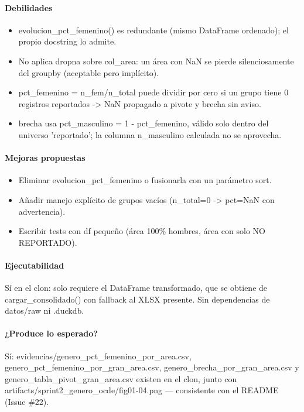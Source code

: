 \paragraph{Debilidades}
\begin{itemize}
  \item evolucion\_pct\_femenino() es redundante (mismo DataFrame ordenado); el propio docstring lo admite.
  \item No aplica dropna sobre col\_area: un área con NaN se pierde silenciosamente del groupby (aceptable pero implícito).
  \item pct\_femenino = n\_fem/n\_total puede dividir por cero si un grupo tiene 0 registros reportados -> NaN propagado a pivote y brecha sin aviso.
  \item brecha usa pct\_masculino = 1 - pct\_femenino, válido solo dentro del universo 'reportado'; la columna n\_masculino calculada no se aprovecha.
\end{itemize}

\paragraph{Mejoras propuestas}
\begin{itemize}
  \item Eliminar evolucion\_pct\_femenino o fusionarla con un parámetro sort.
  \item Añadir manejo explícito de grupos vacíos (n\_total=0 -> pct=NaN con advertencia).
  \item Escribir tests con df pequeño (área 100\% hombres, área con solo NO REPORTADO).
\end{itemize}

\paragraph{Ejecutabilidad}
Sí en el clon: solo requiere el DataFrame transformado, que se obtiene de cargar\_consolidado() con fallback al XLSX presente. Sin dependencias de datos/raw ni .duckdb.

\paragraph{¿Produce lo esperado?}
Sí: evidencias/genero\_pct\_femenino\_por\_area.csv, genero\_pct\_femenino\_por\_gran\_area.csv, genero\_brecha\_por\_gran\_area.csv y genero\_tabla\_pivot\_gran\_area.csv existen en el clon, junto con artifacts/sprint2\_genero\_ocde/fig01-04.png --- consistente con el README (Issue \#22).

